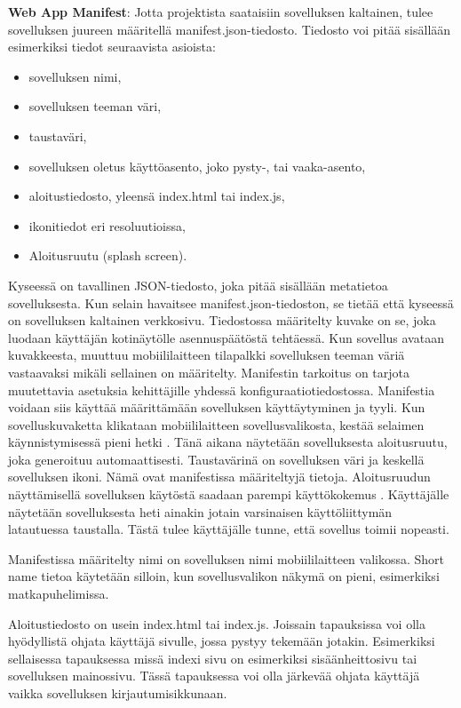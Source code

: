 \documentclass{tktltiki}
\begin{document}
\textbf{Web App Manifest}: Jotta projektista saataisiin sovelluksen kaltainen, tulee sovelluksen juureen määritellä manifest.json-tiedosto. Tiedosto voi pitää sisällään esimerkiksi tiedot seuraavista asioista:

\begin{itemize}
  \item sovelluksen nimi,
  \item sovelluksen teeman väri,
  \item taustaväri,
  \item sovelluksen oletus käyttöasento, joko pysty-, tai vaaka-asento,
  \item aloitustiedosto, yleensä index.html tai index.js,
  \item ikonitiedot eri resoluutioissa,
  \item Aloitusruutu (splash screen).
\end{itemize}

Kyseessä on tavallinen JSON-tiedosto, joka pitää sisällään metatietoa sovelluksesta. Kun selain havaitsee manifest.json-tiedoston, se tietää että kyseessä on sovelluksen kaltainen verkkosivu. Tiedostossa määritelty kuvake on se, joka luodaan käyttäjän kotinäytölle asennuspäätöstä tehtäessä. Kun sovellus avataan kuvakkeesta, muuttuu mobiililaitteen tilapalkki sovelluksen teeman väriä vastaavaksi mikäli sellainen on määritelty. Manifestin tarkoitus on tarjota muutettavia asetuksia kehittäjille yhdessä konfiguraatiotiedostossa. \cite{biorn2017progressive} Manifestia voidaan siis käyttää määrittämään sovelluksen käyttäytyminen ja tyyli.
Kun sovelluskuvaketta klikataan mobiililaitteen sovellusvalikosta, kestää selaimen käynnistymisessä pieni hetki \cite{hiltunen2018creating}. Tänä aikana näytetään sovelluksesta aloitusruutu, joka generoituu automaattisesti. Taustavärinä on sovelluksen väri ja keskellä sovelluksen ikoni. Nämä ovat manifestissa määriteltyjä tietoja. Aloitusruudun näyttämisellä sovelluksen käytöstä saadaan parempi käyttökokemus \cite{hiltunen2018creating}. Käyttäjälle näytetään sovelluksesta heti ainakin jotain varsinaisen käyttöliittymän latautuessa taustalla. Tästä tulee käyttäjälle tunne, että sovellus toimii nopeasti.

Manifestissa määritelty nimi on sovelluksen nimi mobiililaitteen valikossa. Short name tietoa käytetään silloin, kun sovellusvalikon näkymä on pieni, esimerkiksi matkapuhelimissa.

Aloitustiedosto on usein index.html tai index.js. Joissain tapauksissa voi olla hyödyllistä ohjata käyttäjä sivulle, jossa pystyy tekemään jotakin. Esimerkiksi sellaisessa tapauksessa missä indexi sivu on esimerkiksi sisäänheittosivu tai sovelluksen mainossivu. Tässä tapauksessa voi olla järkevää ohjata käyttäjä vaikka sovelluksen kirjautumisikkunaan.
\end{document}

